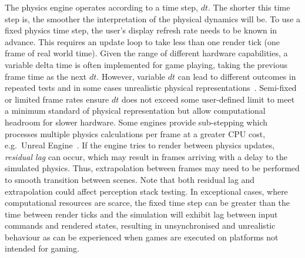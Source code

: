 \documentclass[letterpaper, 10 pt, journal, twoside]{IEEEtran}
\begin{document}
The physics engine operates according to a time step, $dt$. %
The shorter this time step is, the smoother the interpretation of the physical dynamics will be. %
%
%
To use a fixed physics time step, the user's display refresh rate needs to be known in advance. This requires an update loop to take less than one render tick (one frame of real world time). Given the range of different hardware capabilities, a variable delta time is often implemented for game playing, taking the previous frame time as the next $dt$. However, variable $dt$ can lead to different outcomes in repeated tests and in some cases unrealistic physical representations~\cite{gaffer}. 
%
Semi-fixed or limited frame rates ensure $dt$ does not exceed some user-defined limit to meet a minimum standard of physical representation but allow computational headroom for slower hardware. Some engines provide sub-stepping which processes multiple physics calculations per frame at a greater CPU cost, e.g.\ Unreal Engine~\cite{UE4_substepping}. 
%
If the engine tries to render between physics updates, \textit{residual lag} can occur, which may result in frames arriving with a delay to the simulated physics.
%
Thus, extrapolation between frames may need to be performed to smooth transition between scenes. 
%
Note that both residual lag and extrapolation could affect perception stack testing.
%
%
In exceptional cases, where computational resources are scarce, the fixed time step can be greater than the time between render ticks %
and the simulation will exhibit lag between input commands and rendered states, resulting in unsynchronised and unrealistic behaviour as can be experienced when games are executed on platforms not intended for gaming. 
\end{document}
